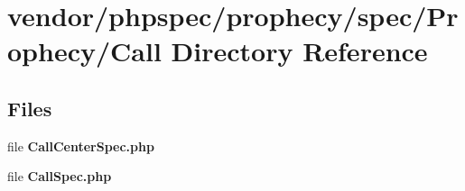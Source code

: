 \section{vendor/phpspec/prophecy/spec/\+Prophecy/\+Call Directory Reference}
\label{dir_366cd07ba801b7041e321e0bfc77f08b}
\subsection*{Files}
\begin{DoxyCompactItemize}
\item 
file {\bf Call\+Center\+Spec.\+php}
\item 
file {\bf Call\+Spec.\+php}
\end{DoxyCompactItemize}
